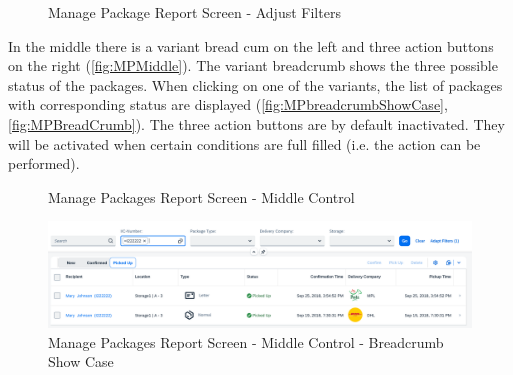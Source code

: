 \begin{figure}[H]
		\centering
	\hspace{5pt}
    \caption{Manage Package Report Screen - Adjust Filters}
    \label{fig:MPAjustFilters}
\end{figure}

In the middle there is a variant bread cum on the left and three action buttons on the right (\autoref{fig:MPMiddle}). The variant breadcrumb shows the three possible status of the packages. When clicking on one of the variants, the list of packages with corresponding status are displayed (\autoref{fig:MPbreadcrumbShowCase}, \autoref{fig:MPBreadCrumb}). The three action buttons are by default inactivated. They will be activated when certain conditions are full filled (i.e. the action can be performed).

\begin{figure}[H]
	\centering
	\hspace{5pt}
  \caption{Manage Packages Report Screen - Middle Control}
	\label{fig:MPMiddle}
\end{figure}

\begin{figure}[H]
	\centering
	\includegraphics[width=1\linewidth]{images/user_doc/managePack/ReportScreen/browse/defaultFreeTextIdUsage.png}
	\caption{Manage Packages Report Screen - Middle Control - Breadcrumb Show Case}
	\label{fig:MPbreadcrumbShowCase}
\end{figure}


